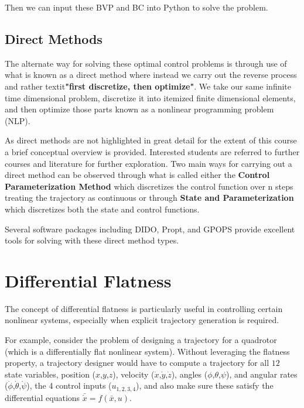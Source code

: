 \documentclass[twoside]{article}
\begin{document}
Then we can input these BVP and BC into Python to solve the problem.


\subsection{Direct Methods}
The alternate way for solving these optimal control problems is through use of what is known as a direct method where instead we carry out the reverse process and rather textit{\textbf{"first discretize, then optimize"}}. We take our same infinite time dimensional problem, discretize it into itemized finite dimensional elements, and then optimize those parts known as a nonlinear programming problem (NLP). 

As direct methods are not highlighted in great detail for the extent of this course a brief conceptual overview is provided. Interested students are referred to further courses and literature for further exploration. Two main ways for carrying out a direct method can be observed through what is called either the \textbf{Control Parameterization Method} which discretizes the control function over n steps treating the trajectory as continuous or through \textbf{State and Parameterization} which discretizes both the state and control functions. 

Several software packages including DIDO, Propt, and GPOPS provide excellent tools for solving with these direct method types. 

\section{Differential Flatness}
The concept of differential flatness is particularly useful in controlling certain nonlinear systems, especially when explicit trajectory generation is required. 

For example, consider the problem of designing a trajectory for a quadrotor (which is a differentially flat nonlinear system). Without leveraging the flatness property, a trajectory designer would have to compute a trajectory for all $12$ state variables, position ($x$,$y$,$z$), velocity ($\dot{x}$,$\dot{y}$,$\dot{z}$), angles ($\phi$,$\theta$,$\psi$), and angular rates ($\dot{\phi}$,$\dot{\theta}$,$\dot{\psi}$), the 4 control inputs ($u_{1,2,3,4}$), and also make sure these satisfy the differential equations $\bar{\dot{x}} = f(\bar{x},u)$. 
\end{document}
